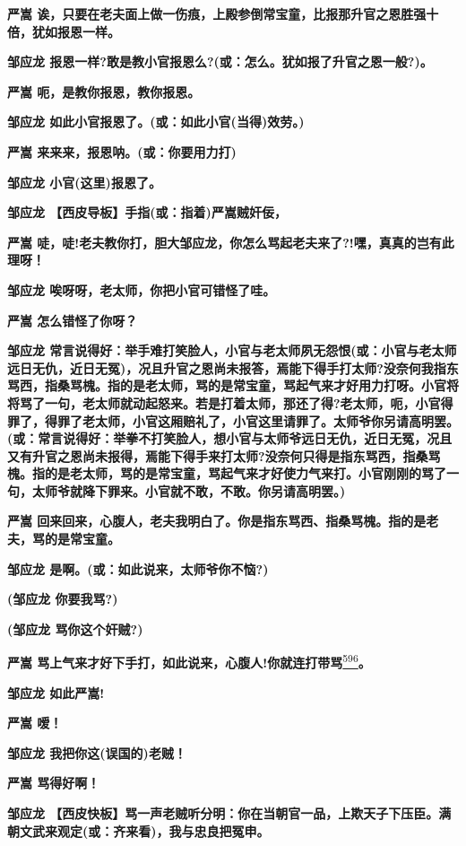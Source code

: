 \textbf{严嵩
诶，只要在老夫面上做一伤痕，上殿参倒常宝童，比报那升官之恩胜强十倍，犹如报恩一样。}

\textbf{邹应龙
报恩一样?敢是教小官报恩么?(或：怎么。犹如报了升官之恩一般?)。}

\textbf{严嵩 呃，是教你报恩，教你报恩。}

\textbf{邹应龙 如此小官报恩了。(或：如此小官(当得)效劳。)}

\textbf{严嵩 来来来，报恩呐。(或：你要用力打)}

\textbf{邹应龙 小官(这里)报恩了。}

\textbf{邹应龙 【西皮导板】手指(或：指着)严嵩贼奸佞，}

\textbf{严嵩
唗，唗!老夫教你打，胆大邹应龙，你怎么骂起老夫来了?!嘿，真真的岂有此理呀！}

\textbf{邹应龙 唉呀呀，老太师，你把小官可错怪了哇。}

\textbf{严嵩 怎么错怪了你呀？}

\textbf{邹应龙
常言说得好：举手难打笑脸人，小官与老太师夙无怨恨(或：小官与老太师远日无仇，近日无冤)，况且升官之恩尚未报答，焉能下得手打太师?没奈何我指东骂西，指桑骂槐。指的是老太师，骂的是常宝童，骂起气来才好用力打呀。小官将将骂了一句，老太师就动起怒来。若是打着太师，那还了得?老太师，呃，小官得罪了，得罪了老太师，小官这厢赔礼了，小官这里请罪了。太师爷你另请高明罢。(或：常言说得好：举拳不打笑脸人，想小官与太师爷远日无仇，近日无冤，况且又有升官之恩尚未报得，焉能下得手来打太师?没奈何只得是指东骂西，指桑骂槐。指的是老太师，骂的是常宝童，骂起气来才好使力气来打。小官刚刚的骂了一句，太师爷就降下罪来。小官就不敢，不敢。你另请高明罢。)}

\textbf{严嵩
回来回来，心腹人，老夫我明白了。你是指东骂西、指桑骂槐。指的是老夫，骂的是常宝童。}

\textbf{邹应龙 是啊。(或：如此说来，太师爷你不恼?)}

\textbf{(邹应龙 你要我骂?)}

\textbf{(邹应龙 骂你这个奸贼?)}

\textbf{严嵩
骂上气来才好下手打，如此说来，心腹人!你就连打带骂}\protect\hyperlink{fn596}{\textsuperscript{596}}\textbf{。}

\textbf{邹应龙 如此严嵩!}

\textbf{严嵩 嗳！}

\textbf{邹应龙 我把你这(误国的)老贼！}

\textbf{严嵩 骂得好啊！}

\textbf{邹应龙
【西皮快板】骂一声老贼听分明：你在当朝官一品，上欺天子下压臣。满朝文武来观定(或：齐来看)，我与忠良把冤申。}


